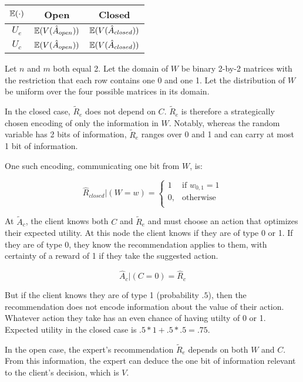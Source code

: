 \documentclass[../thesis.tex]{subfiles}
\begin{document}
\begin{center}
\begin{tabular}{ |c|c|c| } 
 \hline
  $\mathbb{E}(\cdot)$ & Open  & Closed \\
 \hline
 $U_e$ & $\mathbb{E}(V(\hat{A}_{open}))$ & $\mathbb{E}(V(\hat{A}_{closed}))$ \\ 
 $U_c$ & $\mathbb{E}(V(\hat{A}_{open}))$ & $\mathbb{E}(V(\hat{A}_{closed}))$  \\
 \hline
\end{tabular}
\end{center}

\begin{exm}
  Let $n$ and $m$ both equal 2.
  Let the domain of $W$ be binary 2-by-2 matrices with
  the restriction that each row contains one 0 and one 1.
  Let the distribution of $W$ be uniform over the four
  possible matrices in its domain.

  In the closed case, $\tilde{R}_e$ does not depend on $C$.
  $\tilde{R}_e$ is therefore a strategically chosen encoding
  of only the information in $W$.
  Notably, whereas the random variable has 2 bits of information,
  $\tilde{R}_e$ ranges over 0 and 1 and can carry at most 1 bit of
  information.

  One such encoding, communicating one bit from $W$, is:

  $$\hat{R}_{closed} \vert (W = w) = \begin{cases}
    1 & \text{if } w_{0,1} = 1 \\
    0, & \text{otherwise}\\
  \end{cases}$$

  At $\tilde{A}_c$, the client knows both $C$ and $\tilde{R}_e$
  and must choose an action that optimizes their expected utility. 
  At this node the client knows if they are of type 0 or 1.
  If they are of type 0, they know the recommendation applies 
  to them, with certainty of a reward of 1 if they take the suggested action. 

  $$\hat{A}_c \vert (C = 0) = \hat{R}_c$$

  But if the client knows they are of type 1 (probability $.5$),
  then the recommendation
  does not encode information about the value of their action.
  Whatever action they take has an even chance of having utilty of 0 or 1.
  Expected utility in the closed case is $.5 * 1 + .5 * .5 = .75$.
  
  In the open case, the expert's recommendation $\tilde{R}_e$
  depends on both $W$ and $C$.
  From this information, the expert can deduce the one bit of
  information relevant to the client's decision, which is
  $V$.


\end{exm}
\end{document}
